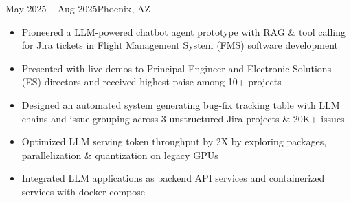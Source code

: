    {}
    {May 2025 -- Aug 2025}{Phoenix, AZ}{}
\begin{itemize}
    \item Pioneered a LLM-powered chatbot agent prototype with RAG \& tool calling
    for Jira tickets in Flight Management System (FMS) software development
    \item Presented with live demos to Principal Engineer and Electronic Solutions (ES) directors 
    and received highest paise among 10+ projects
    \item Designed an automated system generating bug-fix tracking table with LLM chains and issue grouping across 3 unstructured Jira projects \& 20K+ issues
    \item Optimized LLM serving token throughput by 2X by exploring packages, parallelization \& quantization on legacy GPUs
    \item Integrated LLM applications as backend API services and containerized services with docker compose
    
\end{itemize}
\dividerSmall


